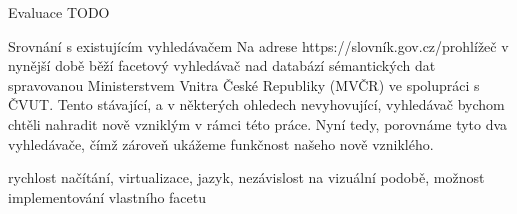 \chap Evaluace
TODO

\sec Srovnání s existujícím vyhledávačem 
Na adrese https://slovník.gov.cz/prohlížeč v nynější době běží facetový vyhledávač nad databází sémantických dat spravovanou Ministerstvem Vnitra České Republiky (MVČR) ve spolupráci s ČVUT.
Tento stávající, a v některých ohledech nevyhovující, vyhledávač bychom chtěli nahradit nově vzniklým v rámci této práce.
Nyní tedy, porovnáme tyto dva vyhledávače, čímž zároveň ukážeme funkčnost našeho nově vzniklého.

 rychlost načítání, virtualizace, jazyk, nezávislost na vizuální podobě, možnost implementování vlastního facetu